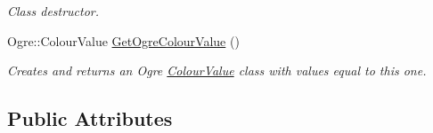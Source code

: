 \begin{DoxyCompactItemize}
\begin{DoxyCompactList}\small\item\em Class destructor. \item\end{DoxyCompactList}\item 
Ogre::ColourValue \hyperlink{classphys_1_1ColourValue_a7a2978ebc5a7e04e02279664f1ea4a86}{GetOgreColourValue} ()
\begin{DoxyCompactList}\small\item\em Creates and returns an Ogre \hyperlink{classphys_1_1ColourValue}{ColourValue} class with values equal to this one. \item\end{DoxyCompactList}\end{DoxyCompactItemize}
\subsection*{Public Attributes}
